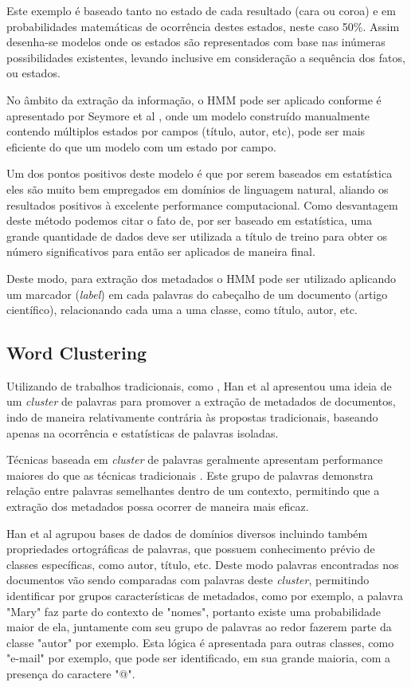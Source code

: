 \documentclass[
	12pt,               %
	openright,          %
	twoside,            %
	a4paper,            %
	english,            %
	brazil              %
	]{abntex2}
\begin{document}
Este exemplo é baseado tanto no estado de cada resultado (cara ou coroa) e em probabilidades matemáticas de ocorrência destes estados, neste caso 50\%. Assim desenha-se modelos onde os estados são representados com base nas inúmeras possibilidades existentes, levando inclusive em consideração a sequência dos fatos, ou estados.

No âmbito da extração da informação, o HMM pode ser aplicado conforme é apresentado por Seymore et al \cite{seymore}, onde um modelo construído manualmente contendo múltiplos estados por campos (título, autor, etc), pode ser mais eficiente do que um modelo com um estado por campo. 

Um dos pontos positivos deste modelo é que por serem baseados em estatística eles são muito bem empregados em domínios de linguagem natural, aliando os resultados positivos à excelente performance computacional. Como desvantagem deste método podemos citar o fato de, por ser baseado em estatística, uma grande quantidade de dados deve ser utilizada a título de treino para obter os número significativos para então ser aplicados de maneira final.

Deste modo, para extração dos metadados o HMM pode ser utilizado aplicando um marcador (\textit{label}) em cada palavras do cabeçalho de um documento (artigo científico), relacionando cada uma a uma classe, como título, autor, etc.

\subsection{Word Clustering}

Utilizando de trabalhos tradicionais, como \cite{svm}, Han et al \cite{rule-based} apresentou uma ideia de um \textit{cluster} de palavras para promover a extração de metadados de documentos, indo de maneira relativamente contrária às propostas tradicionais, baseando apenas na ocorrência e estatísticas de palavras isoladas.

Técnicas baseada em \textit{cluster} de palavras geralmente apresentam performance maiores do que as técnicas tradicionais \cite{rule-based}. Este grupo de palavras demonstra relação entre palavras semelhantes dentro de um contexto, permitindo que a extração dos metadados possa ocorrer de maneira mais eficaz.

Han et al agrupou bases de dados de domínios diversos incluindo também propriedades ortográficas de palavras, que possuem conhecimento prévio de classes específicas, como autor, título, etc. Deste modo palavras encontradas nos documentos vão sendo comparadas com palavras deste \textit{cluster}, permitindo identificar por grupos características de metadados, como por exemplo, a palavra "Mary" faz parte do contexto de "nomes", portanto existe uma probabilidade maior de ela, juntamente com seu grupo de palavras ao redor fazerem parte da classe "autor" por exemplo. Esta lógica é apresentada para outras classes, como "e-mail" por exemplo, que pode ser identificado, em sua grande maioria, com a presença do caractere "@".
\end{document}
